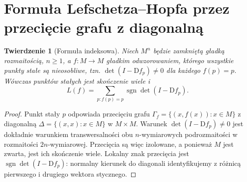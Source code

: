 \documentclass[11pt,a4paper,oneside]{report}
\newcommand{\D}{\mathrm D}
\theoremstyle{plain}
\newtheorem{twierdzenie}{Twierdzenie}[section]
\theoremstyle{definition}
\theoremstyle{remark}
\begin{document}
\section{Formuła Lefschetza--Hopfa przez przecięcie grafu z diagonalną}
\begin{twierdzenie}[Formuła indeksowa]
\label{thm:lefschetz-hopf-v10}
Niech $M^n$ będzie zamkniętą gładką rozmaitością,
$n\ge1$, a $f:M\to M$ gładkim odwzorowaniem,
którego wszystkie punkty stałe są nieosobliwe,
tzn. $\det(I-\D f_p)\ne0$ dla każdego $f(p)=p$.
Wówczas punktów stałych jest skończenie wiele i
\[
 L(f)=\sum_{p:f(p)=p}\operatorname{sgn}\det(I-\D f_p).
\]
\end{twierdzenie}
\begin{proof}
Punkt stały $p$ odpowiada przecięciu grafu
$\Gamma_f=\{(x,f(x)):x\in M\}$ z diagonalną
$\Delta=\{(x,x):x\in M\}$ w $M\times M$.
Warunek $\det(I-\D f_p)\ne0$ jest dokładnie warunkiem
transwersalności obu $n$-wymiarowych podrozmaitości
w rozmaitości $2n$-wymiarowej. Przecięcia są więc
izolowane, a ponieważ $M$ jest zwarta, jest ich
skończenie wiele. Lokalny znak przecięcia jest
$\operatorname{sgn}\det(I-\D f_p)$: normalny kierunek
do diagonali identyfikujemy z różnicą pierwszego
i drugiego wektora stycznego.


\end{proof}
\end{document}
